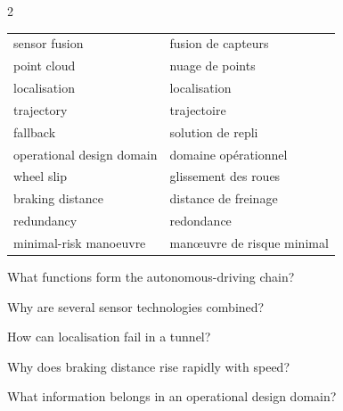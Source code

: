 \begin{multicols}{2}
\begin{tcolorbox}[title=\sffamily\bfseries Illustrative braking distance,colback=white,colframe=ECOrange]
\begin{center}
\end{center}
\end{tcolorbox}

\begin{vocabulary}
\begin{tabularx}{\linewidth}{@{}lX@{}}
sensor fusion & fusion de capteurs\\
point cloud & nuage de points\\
localisation & localisation\\
trajectory & trajectoire\\
fallback & solution de repli\\
operational design domain & domaine opérationnel\\
wheel slip & glissement des roues\\
braking distance & distance de freinage\\
redundancy & redondance\\
minimal-risk manoeuvre & manœuvre de risque minimal
\end{tabularx}
\end{vocabulary}

\begin{questions}
\item What functions form the autonomous-driving chain?
\item Why are several sensor technologies combined?
\item How can localisation fail in a tunnel?
\item Why does braking distance rise rapidly with speed?
\item What information belongs in an operational design domain?
\end{questions}


\end{multicols}
